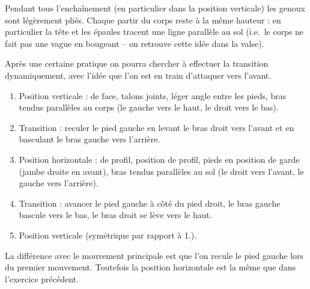 \begin{exercice}
	Pendant tous l'enchaînement (en particulier dans la position verticale) les genoux sont légèrement pliés.
	Chaque partir du corps reste à la même hauteur : en particulier la tête et les épaules tracent une ligne parallèle au sol (i.e.\ le corps ne fait pas une vague en bougeant -- on retrouve cette idée dans la valse).

	Après une certaine pratique on pourra chercher à effectuer la transition dynamiquement, avec l'idée que l'on est en train d'attaquer vers l'avant.

\end{exercice}


\begin{exercice}
	\label{struc:ex:roue-arrière}
	

	\begin{enumerate}
		\item Position verticale : de face, talons joints, léger angle entre les pieds, bras tendus parallèles au corps (le gauche vers le haut, le droit vers le bas).
		
		\item Transition : reculer le pied gauche en levant le bras droit vers l'avant et en basculant le bras gauche vers l'arrière.
		
		\item Position horizontale : de profil, position de profil, pieds en position de garde (jambe droite en avant), bras tendus parallèles au sol (le droit vers l'avant, le gauche vers l'arrière).
		
		\item Transition : avancer le pied gauche à côté du pied droit, le bras gauche bascule vers le bas, le bras droit se lève vers le haut.
		
		\item Position verticale (symétrique par rapport à 1.).
	\end{enumerate}

	La différence avec le mouvement principale est que l'on recule le pied gauche lors du premier mouvement.
	Toutefois la position horizontale est la même que dans l'exercice précédent.

\end{exercice}


